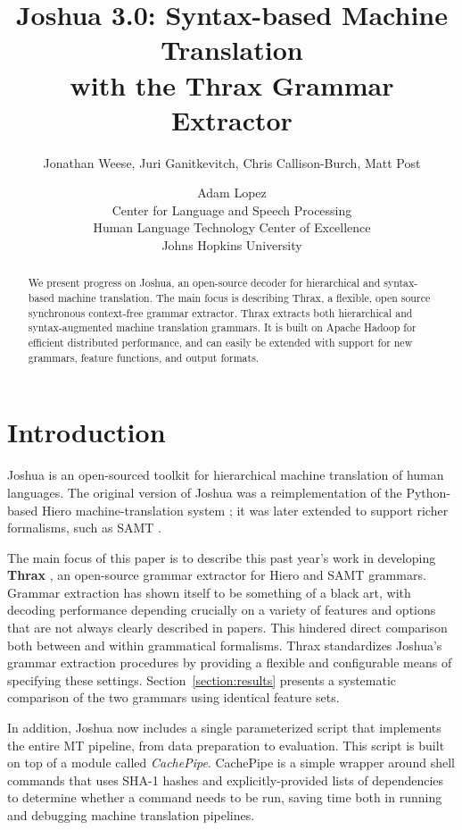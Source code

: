 \documentclass[11pt]{article}
\title{Joshua 3.0: Syntax-based Machine Translation \\ with the Thrax
  Grammar Extractor}
\author{Jonathan Weese\aff, Juri Ganitkevitch\aff, Chris
   Callison-Burch\aff, Matt Post\afff \and Adam Lopez\aff\afff \\
 \aff Center for Language and Speech Processing \\
 \afff Human Language Technology Center of Excellence \\
 Johns Hopkins University}
\date{}
\begin{document}
\maketitle

\begin{abstract}
We present progress on Joshua, an open-source decoder for hierarchical
and syntax-based machine translation.  The main focus is describing
Thrax, a flexible, open source synchronous context-free grammar
extractor.  Thrax extracts both hierarchical \cite{Chiang2007} and
syntax-augmented machine translation \cite{samt2006} grammars.  It is
built on Apache Hadoop for efficient distributed performance, and can
easily be extended with support for new grammars, feature functions,
and output formats.
\end{abstract}

\section{Introduction}

Joshua is an open-sourced toolkit for hierarchical machine translation
of human languages.  The original version of Joshua \cite{Joshua-WMT}
was a reimplementation of the Python-based Hiero machine-translation
system \cite{Chiang2007}; it was later extended \cite{li2010joshua} to
support richer formalisms, such as SAMT \cite{samt2006}.

The main focus of this paper is to describe this past year's work in
developing {\bf Thrax} \cite{jonnymasters}, an open-source grammar extractor for Hiero and
SAMT grammars.  Grammar extraction has shown itself to be something of
a black art, with decoding performance depending crucially on a
variety of features and options that are not always clearly described in papers.
This hindered direct comparison both between and within grammatical formalisms.
Thrax standardizes Joshua's grammar extraction procedures by providing
a flexible and configurable means of specifying these settings.
Section~\ref{section:results} presents a systematic comparison of the
two grammars using identical feature sets.

In addition, Joshua now includes a single parameterized script that
implements the entire MT pipeline, from data preparation to
evaluation.  This script is built on top of a module called
\emph{CachePipe}.  CachePipe is a simple wrapper around shell commands
that uses SHA-1 hashes and explicitly-provided lists of dependencies
to determine whether a command needs to be run, saving time both in
running and debugging machine translation pipelines.
\end{document}
